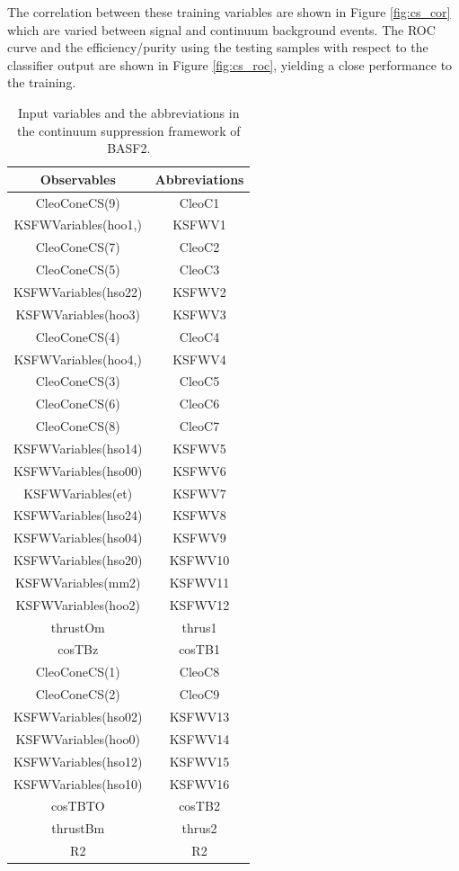 The correlation between these training variables are shown in Figure \ref{fig:cs_cor} which are varied between signal and continuum background events. The ROC curve and the efficiency/purity using the testing samples with respect to the classifier output are shown in Figure \ref{fig:cs_roc}, yielding a close performance to the training.
\begin{table}[htpb]
	\begin{minipage}[t]{1\linewidth}
		\centering
		\caption{Input variables and the abbreviations in the continuum suppression framework of BASF2.}
		\label{tab:cs_abr}
		\begin{tabular}{c|c}
			\hline
			Observables &  Abbreviations\\
			\hline
			CleoConeCS(9) &  CleoC1 \\
			KSFWVariables(hoo1,) & KSFWV1 \\
			CleoConeCS(7) & CleoC2\\
			CleoConeCS(5) & CleoC3\\
			KSFWVariables(hso22) & KSFWV2\\
			KSFWVariables(hoo3) & KSFWV3\\
			CleoConeCS(4) & CleoC4 \\
			KSFWVariables(hoo4,) &  KSFWV4\\
			CleoConeCS(3) & CleoC5 \\
			CleoConeCS(6) & CleoC6\\
			CleoConeCS(8) & CleoC7\\
			KSFWVariables(hso14) &   KSFWV5\\
			KSFWVariables(hso00) & KSFWV6\\
			KSFWVariables(et) & KSFWV7\\
			KSFWVariables(hso24) & KSFWV8\\
			KSFWVariables(hso04) & KSFWV9\\
			KSFWVariables(hso20) & KSFWV10 \\
			KSFWVariables(mm2)  & KSFWV11\\
			KSFWVariables(hoo2) &  KSFWV12\\
			thrustOm & thrus1 \\
			cosTBz & cosTB1\\
			CleoConeCS(1) & CleoC8 \\
			CleoConeCS(2) & CleoC9 \\
			KSFWVariables(hso02) &  KSFWV13\\
			KSFWVariables(hoo0) &  KSFWV14 \\
			KSFWVariables(hso12) &  KSFWV15\\
			KSFWVariables(hso10) & KSFWV16\\
			cosTBTO & cosTB2\\
			thrustBm & thrus2\\
			R2 & R2\\
			\hline
		\end{tabular}
	\end{minipage}
\end{table}

